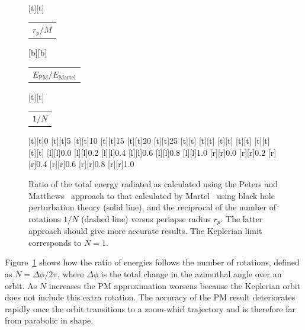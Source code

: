 \documentclass[aps,prd,amsfonts,amssymb,amsmath,nofootinbib,floatfix,reprint,showpacs,groupedaddress]{revtex4-1}
\newcommand{\Figref}[1]{Figure~\ref{fig:#1}}
\begin{document}
\begin{figure}
\begin{psfrags}%
\psfragscanon%
%
[t][t]{\color[rgb]{0,0,0}\setlength{\tabcolsep}{0pt}\begin{tabular}{c}{\Large$r_p/M$}\end{tabular}}%
[b][b]{\color[rgb]{0,0,0}\setlength{\tabcolsep}{0pt}\begin{tabular}{c}{\Large$E_\text{PM}/E_\text{Martel}$}\end{tabular}}%
[t][t]{\color[rgb]{0,0,0}\setlength{\tabcolsep}{0pt}\begin{tabular}{c}{\Large$1/N$}\end{tabular}}%
%
[t][t]{0}%
[t][t]{5}%
[t][t]{10}%
[t][t]{15}%
[t][t]{20}%
[t][t]{25}%
[t][t]{}%
[t][t]{}%
[t][t]{}%
[t][t]{}%
[t][t]{}%
[t][t]{}%
%
[l][l]{0.0}%
[l][l]{0.2}%
[l][l]{0.4}%
[l][l]{0.6}%
[l][l]{0.8}%
[l][l]{1.0}%
[r][r]{0.0}%
[r][r]{0.2}%
[r][r]{0.4}%
[r][r]{0.6}%
[r][r]{0.8}%
[r][r]{1.0}%
%
%
\end{psfrags}%
\caption{Ratio of the total energy radiated as calculated using the Peters and Matthews~\cite{Peters1963} approach to that calculated by Martel~\cite{Martel2004a} using black hole perturbation theory (solid line), and the reciprocal of the number of rotations $1/N$ (dashed line) versus periapse radius $r_{p}$. The latter approach should give more accurate results. The Keplerian limit corresponds to $N = 1$.\label{fig:Ratio}}
\end{figure}
\Figref{Ratio} shows how the ratio of energies follows the number of rotations, defined as $N = {\Delta \phi}/{2\pi}$, where $\Delta \phi$ is the total change in the azimuthal angle over an orbit. As $N$ increases the PM approximation worsens because the Keplerian orbit does not include this extra rotation. The accuracy of the PM result deteriorates rapidly once the orbit transitions to a zoom-whirl trajectory and is therefore far from parabolic in shape.
\end{document}
